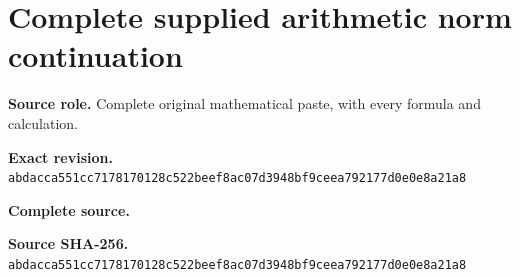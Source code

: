 \begingroup
\sloppy
\small
\clearpage
\section{Complete supplied arithmetic norm continuation}
\noindent\textbf{Source role.} Complete original mathematical paste, with every formula and calculation.\par
\noindent\textbf{Exact revision.} \nolinkurl{abdacca551cc7178170128c522beef8ac07d3948bf9ceea792177d0e0e8a21a8}\par
\noindent\textbf{Complete source.} \par
\noindent\textbf{Source SHA-256.} \nolinkurl{abdacca551cc7178170128c522beef8ac07d3948bf9ceea792177d0e0e8a21a8}\par\medskip

\endgroup
